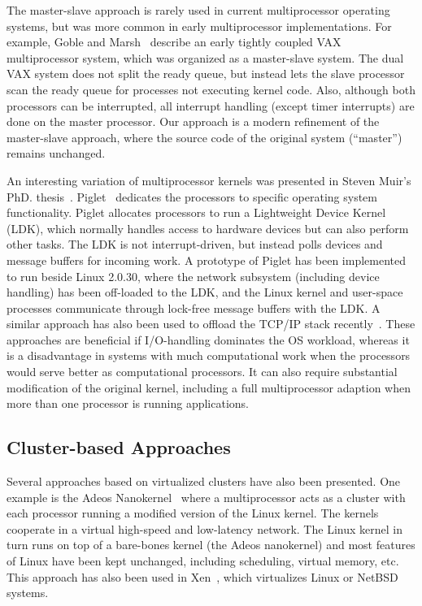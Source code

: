 The master-slave approach is rarely used in current multiprocessor operating
systems, but was more common in early multiprocessor implementations. For
example, \label{fix:goble}Goble and Marsh~\cite{goble82dualvax} describe an
early tightly coupled VAX multiprocessor system, which was organized as a
master-slave system. The dual VAX system does not split the ready queue, but
instead lets the slave processor scan the ready queue for processes not
executing kernel code. Also, although both processors can be interrupted, all
interrupt handling (except timer interrupts) are done on the master processor.
Our approach is a modern refinement of the master-slave approach, where the
source code of the original system (``master'') remains unchanged.


An interesting variation of multiprocessor kernels was presented in Steven
Muir's PhD. thesis~\cite{muir01piglet}\label{fix:muir}.
Piglet~\cite{muir01piglet} dedicates the processors to specific operating
system functionality.  Piglet allocates processors to run a Lightweight Device
Kernel (LDK), which normally handles access to hardware devices but can also
perform other tasks. The LDK is not interrupt-driven, but instead polls
devices and message buffers for incoming work. A prototype of Piglet has been
implemented to run beside Linux 2.0.30, where the network subsystem (including
device handling) has been off-loaded to the LDK, and the Linux kernel and
user-space processes communicate through lock-free message buffers with the
LDK. A similar approach has also been used to offload the TCP/IP stack
recently~\cite{regnier2004tcp}. These approaches are beneficial if
I/O-handling dominates the OS workload, whereas it is a disadvantage in
systems with much computational work when the processors would serve better as
computational processors. It can also require substantial modification of the
original kernel, including a full multiprocessor adaption when more than one
processor is running applications.

\subsection{Cluster-based Approaches}
Several approaches based on virtualized clusters have also been presented. One
example is the Adeos Nanokernel~\cite{yaghmour2002} where a multiprocessor
acts as a cluster with each processor running a modified version of the Linux
kernel. The kernels cooperate in a virtual high-speed and low-latency network.
The Linux kernel in turn runs on top of a bare-bones kernel (the Adeos
nanokernel) and most features of Linux have been kept unchanged, including
scheduling, virtual memory, etc. This approach has also been used in
Xen~\cite{barham03xen}\label{fix:xen}, which virtualizes Linux or NetBSD
systems.

